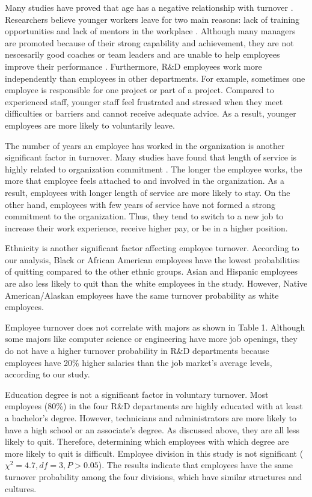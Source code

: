 Many studies have proved that age has a negative relationship with turnover \citep{rhodes1983}. Researchers believe younger workers leave for two main reasons: lack of training opportunities and lack of mentors in the workplace \citep{paul2012}. Although many managers are promoted because of their strong capability and achievement, they are not nescesarily good coaches or team leaders and are unable to help employees improve their performance \citep{smith2009}. Furthermore, R\&D employees work more independently than employees in other departments. For example, sometimes one employee is responsible for one project or part of a project. Compared to experienced staff, younger staff feel frustrated and stressed when they meet difficulties or barriers and cannot receive adequate advice. As a result, younger employees are more likely to voluntarily leave.  

The number of years an employee has worked in the organization is another significant factor in turnover. Many studies have found that length of service is highly related to organization commitment \citep{Jena2015, Kelarijani2014, Popoola2006}. The longer the employee works, the more that employee feels attached to and involved in the organization. As a result, employees with longer length of service are more likely to stay. On the other hand, employees with few years of service have not formed a strong commitment to the organization. Thus, they tend to switch to a new job to increase their work experience, receive higher pay, or be in a higher position.

Ethnicity is another significant factor affecting employee turnover. According to our analysis, Black or African American employees have the lowest probabilities of quitting compared to the other ethnic groups. Asian and Hispanic employees are also less likely to quit than the white employees in the study. However, Native American/Alaskan employees have the same turnover probability as white employees.   

Employee turnover does not correlate with majors as shown in Table 1. Although some majors like computer science or engineering have more job openings, they do not have a higher turnover probability in R\&D departments because employees have 20\% higher salaries than the job market's average levels, according to our study. 

Education degree is not a significant factor in voluntary turnover. Most employees (80\%) in the four R\&D departments are highly educated with at least a bachelor's degree. However, technicians and administrators are more likely to have a high school or an associate's degree. As discussed above, they are all less likely to quit. Therefore, determining which employees with which degree are more likely to quit is difficult.
Employee division in this study is not significant ($\chi^2=4.7, df=3, P > 0.05$). The results indicate that employees have the same turnover probability among the four divisions, which have similar structures and cultures. 
 
